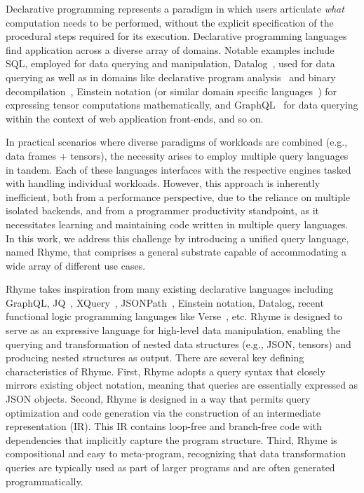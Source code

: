 \documentclass[runningheads]{llncs}
\newcommand{\lang}{Rhyme}
\begin{document}
Declarative programming represents a paradigm in which users articulate \emph{what}
computation needs to be performed, without the explicit specification of the
procedural steps required for its execution.
Declarative programming languages find application across a diverse array of
domains.
Notable examples include SQL, employed for data querying and manipulation,
Datalog~\cite{datalog}, used for data querying as well as in domains like
declarative program analysis~\cite{proganalysis_first, logic_proganalysis, souffle_cav}
and binary decompilation~\cite{ddissam}, Einstein notation (or similar domain
specific languages~\cite{tensor_comprehensions}) for expressing tensor computations
mathematically, and GraphQL~\cite{graphql} for data querying within the context of web application
front-ends, and so on.

In practical scenarios where diverse paradigms of workloads are combined
(e.g., data frames + tensors), the necessity arises to employ multiple
query languages in tandem.
Each of these languages interfaces with the respective engines tasked
with handling individual workloads.
However, this approach is inherently inefficient, both from a performance
perspective, due to the reliance on multiple isolated backends, and from
a programmer productivity standpoint, as it necessitates learning and
maintaining code written in multiple query languages.
In this work, we address this challenge by introducing a unified query language, 
named \lang{},
that comprises a general substrate capable of accommodating a wide array of
different use cases.

\lang{} takes inspiration from many existing declarative languages
including GraphQL, JQ~\cite{jq}, XQuery~\cite{xquery}, JSONPath~\cite{jsonpath}, Einstein notation,
Datalog, recent functional logic programming languages like Verse~\cite{verse}, etc.
\lang{} is designed to serve as an expressive language for high-level data
manipulation, enabling the querying and transformation of nested data structures
(e.g., JSON, tensors)
and producing nested structures as output.
There are several key defining characteristics of \lang{}.
First, \lang{} adopts a query syntax that closely mirrors existing object notation,
meaning that queries are essentially expressed as JSON objects.
Second, \lang{} is designed in a way that permits query optimization and
code generation via the construction of an intermediate representation (IR).
This IR contains loop-free and branch-free code with dependencies that implicitly
capture the program structure.
Third, \lang{} is compositional and easy to meta-program, recognizing that data
transformation queries are typically used as part of larger programs and are often
generated programmatically.
\end{document}
